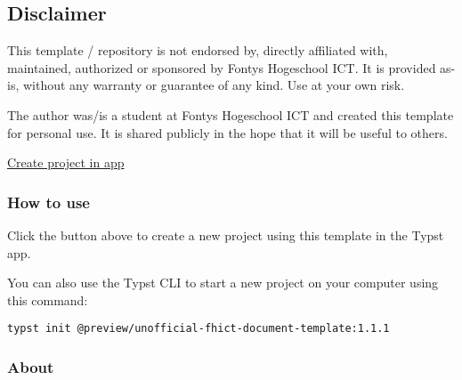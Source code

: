 \subsection{Disclaimer}\label{disclaimer}

This template / repository is not endorsed by, directly affiliated with,
maintained, authorized or sponsored by Fontys Hogeschool ICT. It is
provided as-is, without any warranty or guarantee of any kind. Use at
your own risk.

The author was/is a student at Fontys Hogeschool ICT and created this
template for personal use. It is shared publicly in the hope that it
will be useful to others.

\href{/app?template=unofficial-fhict-document-template&version=1.1.1}{Create
project in app}

\subsubsection{How to use}\label{how-to-use}

Click the button above to create a new project using this template in
the Typst app.

You can also use the Typst CLI to start a new project on your computer
using this command:

\begin{verbatim}
typst init @preview/unofficial-fhict-document-template:1.1.1
\end{verbatim}



\subsubsection{About}\label{about}

